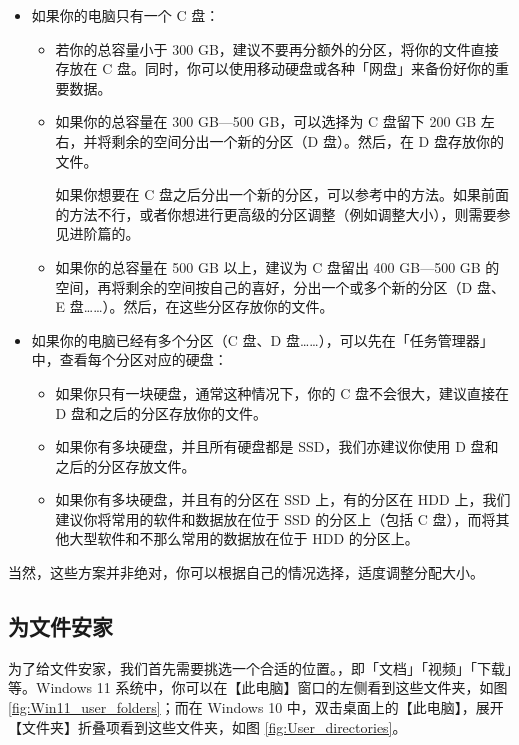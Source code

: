 {{{{\begin{itemize}
  \item 如果你的电脑只有一个 C 盘：
  \begin{itemize}
    \item 若你的总容量小于 300 GB，建议不要再分额外的分区，将你的文件直接存放在 C 盘。同时，你可以使用移动硬盘或各种「网盘」来备份好你的重要数据。
    \item 如果你的总容量在 300 GB—500 GB，可以选择为 C 盘留下 200 GB 左右，并将剩余的空间分出一个新的分区（D 盘）。然后，在 D 盘存放你的文件。
      \begin{note}
        如果你想要在 C 盘之后分出一个新的分区，可以参考中的方法。如果前面的方法不行，或者你想进行更高级的分区调整（例如调整大小），则需要参见进阶篇的。
      \end{note}
    \item 如果你的总容量在 500 GB 以上，建议为 C 盘留出 400 GB—500 GB 的空间，再将剩余的空间按自己的喜好，分出一个或多个新的分区（D 盘、E 盘……）。然后，在这些分区存放你的文件。
  \end{itemize}
  \item 如果你的电脑已经有多个分区（C 盘、D 盘……），可以先在「任务管理器」中，查看每个分区对应的硬盘：
  \begin{itemize}
    \item 如果你只有一块硬盘，通常这种情况下，你的 C 盘不会很大，建议直接在 D 盘和之后的分区存放你的文件。
    \item 如果你有多块硬盘，并且所有硬盘都是 SSD，我们亦建议你使用 D 盘和之后的分区存放文件。
    \item 如果你有多块硬盘，并且有的分区在 SSD 上，有的分区在 HDD 上，我们建议你将常用的软件和数据放在位于 SSD 的分区上（包括 C 盘），而将其他大型软件和不那么常用的数据放在位于 HDD 的分区上。
  \end{itemize}
\end{itemize}

当然，这些方案并非绝对，你可以根据自己的情况选择，适度调整分配大小。

\subsection{为文件安家}

为了给文件安家，我们首先需要挑选一个合适的位置。，即「文档」「视频」「下载」等。Windows 11 系统中，你可以在【此电脑】窗口的左侧看到这些文件夹，如图 \ref{fig:Win11_user_folders}；而在 Windows 10 中，双击桌面上的【此电脑】，展开【文件夹】折叠项看到这些文件夹，如图 \ref{fig:User_directories}。

}}}}
